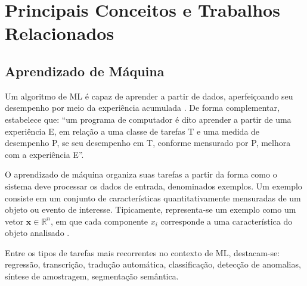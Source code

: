 \chapter{Principais Conceitos e Trabalhos Relacionados}\label{cap_2}

\section{Aprendizado de Máquina}

Um algoritmo de \ac{ML} é capaz de aprender a partir de dados, aperfeiçoando seu desempenho por meio da experiência acumulada \cite{goodfellow2016deep}. De forma complementar,  estabelece que: ``um programa de computador é dito aprender a partir de uma experiência E, em relação a uma classe de tarefas T e uma medida de desempenho P, se seu desempenho em T, conforme mensurado por P, melhora com a experiência E''.



O aprendizado de máquina organiza suas tarefas a partir da forma como o sistema deve processar os dados de entrada, denominados exemplos. Um exemplo consiste em um conjunto de características quantitativamente mensuradas de um objeto ou evento de interesse. Tipicamente, representa-se um exemplo como um vetor $\mathbf{x} \in \mathbb{R}^n$, em que cada componente $x_i$ corresponde a uma característica do objeto analisado \cite{goodfellow2016deep}.

Entre os tipos de tarefas mais recorrentes no contexto de \ac{ML}, destacam-se: regressão, transcrição, tradução automática, classificação, detecção de anomalias, síntese de amostragem, segmentação semântica. 





